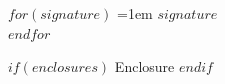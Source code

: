 \documentclass[$if(fontsize)$$fontsize$,$endif$$if(lang)$$lang$,$endif$$if(papersize)$$papersize$,$endif$$for(classoption)$$classoption$$sep$,$endfor$]{$documentclass$}
\newcommand{\Signature}[1]{\noindent #1\\}
\begin{document}
\vspace{48pt}

\begin{minipage}[t]{.5\linewidth-3em}
\hspace{3em}
\end{minipage}%
\hspace{3em}%
\noindent
\begin{minipage}[t]{29ex}
  \raggedright
  $for(signature)$
  \hangindent=1em
  \Signature{$signature$}
  $endfor$
\end{minipage}
$if(enclosures)$
\vspace{\baselineskip}
Enclosure
$endif$
\end{document}
